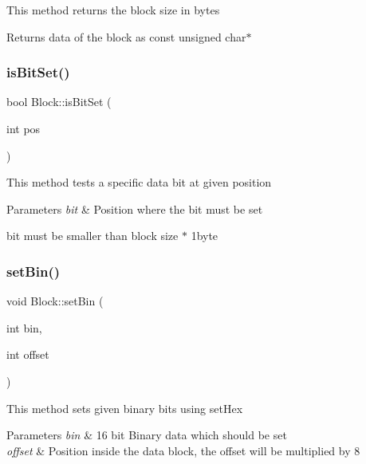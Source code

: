 This method returns the block size in bytes

\begin{DoxyReturn}{Returns}
data of the block as const unsigned char$\ast$ 
\end{DoxyReturn}
\mbox{\label{classlogic_1_1_block_a0130b21b567a1149edcc02c48ccc52ef}} 
\subsubsection{\texorpdfstring{is\+Bit\+Set()}{isBitSet()}}
{\footnotesize\ttfamily bool Block\+::is\+Bit\+Set (\begin{DoxyParamCaption}\item[{int}]{pos }\end{DoxyParamCaption})}

This method tests a specific data bit at given position


\begin{DoxyParams}{Parameters}
{\em bit} & Position where the bit must be set\\
\hline
\end{DoxyParams}
bit must be smaller than block size $\ast$ 1byte \mbox{\label{classlogic_1_1_block_a9f25c077733b21120df01e5174a8dfc7}} 
\subsubsection{\texorpdfstring{set\+Bin()}{setBin()}}
{\footnotesize\ttfamily void Block\+::set\+Bin (\begin{DoxyParamCaption}\item[{int}]{bin,  }\item[{int}]{offset }\end{DoxyParamCaption})}

This method sets given binary bits using set\+Hex


\begin{DoxyParams}{Parameters}
{\em bin} & 16 bit Binary data which should be set\\
\hline
{\em offset} & Position inside the data block, the offset will be multiplied by 8 \\
\hline
\end{DoxyParams}
\mbox{\label{classlogic_1_1_block_acb19637acf2ec89d7d9fde9b40b3cd29}} 
